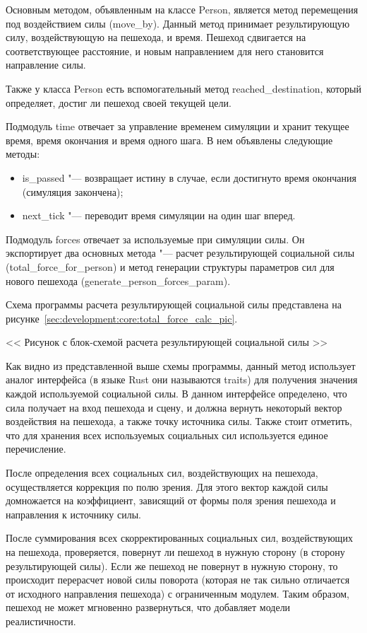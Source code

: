 Основным методом, объявленным на классе Person, является метод перемещения под воздействием силы (move\_by).
Данный метод принимает результирующую силу, воздействующую на пешехода, и время.
Пешеход сдвигается на соответствующее расстояние, и новым направлением для него становится направление силы.

Также у класса Person есть вспомогательный метод reached\_destination, который определяет, достиг ли пешеход своей текущей цели.

Подмодуль time отвечает за управление временем симуляции и хранит текущее время, время окончания и время одного шага.
В нем объявлены следующие методы:
\begin{itemize}
  \item is\_passed "--- возвращает истину в случае, если достигнуто время окончания (симуляция закончена);
  \item next\_tick "--- переводит время симуляции на один шаг вперед.
\end{itemize}

Подмодуль forces отвечает за используемые при симуляции силы.
Он экспортирует два основных метода "--- расчет результирующей социальной силы (total\_force\_for\_person)
и метод генерации структуры параметров сил для нового пешехода (generate\_person\_forces\_param).

Схема программы расчета результирующей социальной силы представлена на рисунке~\ref{sec:development:core:total_force_calc_pic}.

<< Рисунок с блок-схемой расчета результирующей социальной силы >>

Как видно из представленной выше схемы программы, данный метод использует аналог интерфейса (в языке Rust они называются traits) для получения значения каждой используемой социальной силы.
В данном интерфейсе определено, что сила получает на вход пешехода и сцену, и должна вернуть некоторый вектор воздействия на пешехода, а также точку источника силы.
Также стоит отметить, что для хранения всех используемых социальных сил используется единое перечисление.

После определения всех социальных сил, воздействующих на пешехода, осуществляется коррекция по полю зрения.
Для этого вектор каждой силы домножается на коэффициент, зависящий от формы поля зрения пешехода и направления к источнику силы.

После суммирования всех скорректированных социальных сил, воздействующих на пешехода, проверяется, повернут ли пешеход в нужную сторону (в сторону результирующей силы).
Если же пешеход не повернут в нужную сторону, то происходит перерасчет новой силы поворота (которая не так сильно отличается от исходного направления пешехода) с ограниченным модулем.
Таким образом, пешеход не может мгновенно развернуться, что добавляет модели реалистичности.

